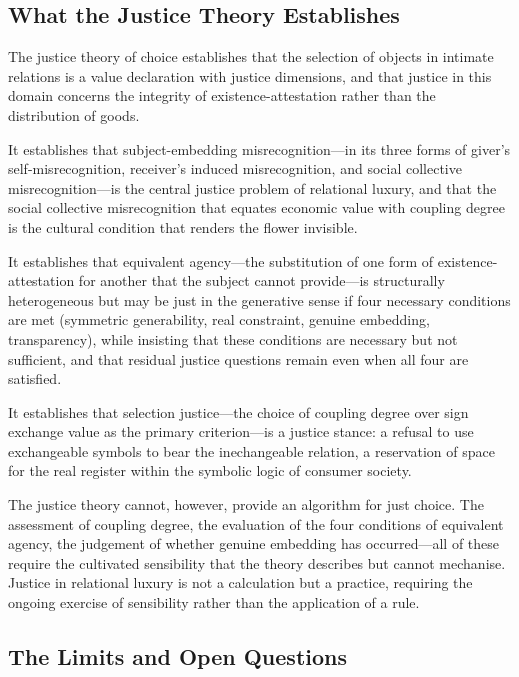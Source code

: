 \subsection{What the Justice Theory Establishes}
\label{p16:subsec:justice_establishes}

\noindent
The justice theory of choice establishes that the selection of objects in intimate relations is a value declaration with justice dimensions, and that justice in this domain concerns the integrity of existence-attestation rather than the distribution of goods.

It establishes that subject-embedding misrecognition---in its three forms of giver's self-misrecognition, receiver's induced misrecognition, and social collective misrecognition---is the central justice problem of relational luxury, and that the social collective misrecognition that equates economic value with coupling degree is the cultural condition that renders the flower invisible.

It establishes that equivalent agency---the substitution of one form of existence-attestation for another that the subject cannot provide---is structurally heterogeneous but may be just in the generative sense if four necessary conditions are met (symmetric generability, real constraint, genuine embedding, transparency), while insisting that these conditions are necessary but not sufficient, and that residual justice questions remain even when all four are satisfied.

It establishes that selection justice---the choice of coupling degree over sign exchange value as the primary criterion---is a justice stance: a refusal to use exchangeable symbols to bear the inechangeable relation, a reservation of space for the real register within the symbolic logic of consumer society.

The justice theory cannot, however, provide an algorithm for just choice. The assessment of coupling degree, the evaluation of the four conditions of equivalent agency, the judgement of whether genuine embedding has occurred---all of these require the cultivated sensibility that the theory describes but cannot mechanise. Justice in relational luxury is not a calculation but a practice, requiring the ongoing exercise of sensibility rather than the application of a rule.

\subsection{The Limits and Open Questions}
\label{p16:subsec:limits-open}


